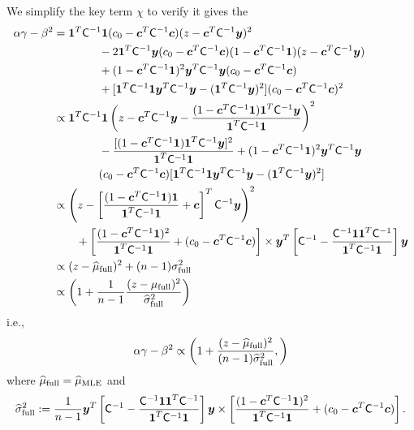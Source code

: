 \documentclass{iitthesis}          %
\newcommand{\bm}[1]{\boldsymbol{#1}}
\newcommand{\vc}{\bm{c}}
\newcommand{\vy}{\bm{y}}
\newcommand{\vone}{\bm{1}}
\newcommand{\mC}{\mathsf{C}}
\newcommand{\hmu}{\widehat{\mu}}
\newcommand{\hsigma}{\widehat{\sigma}}
\newcommand{\MLE}{\textup{MLE}}
\begin{document}
\iffalse
We simplify the key term $\chi$ to verify it gives the 
\begin{align*}
\alpha \gamma - \beta^2 
& = \vone^T \mC^{-1} \vone (c_0  -\vc ^T \mC^{-1} \vc) (z - \vc^T \mC^{-1} \vy )^2 \\
& \qquad \qquad - 2 \vone^T \mC^{-1} \vy (c_0  -\vc ^T \mC^{-1} \vc)(1 - \vc^T \mC^{-1} \vone)(z - \vc^T \mC^{-1} \vy ) \\
& \qquad \qquad + (1 - \vc^T \mC^{-1} \vone)^2 \vy^T \mC^{-1} \vy (c_0  -\vc ^T \mC^{-1} \vc) \\
&\qquad \qquad  + [\vone^T \mC^{-1} \vone \vy^T \mC^{-1} \vy - (\vone^T \mC^{-1} \vy)^2](c_0  -\vc ^T \mC^{-1} \vc)^2  \\
& \propto \vone^T \mC^{-1} \vone  \left (z - \vc^T \mC^{-1} \vy - \frac{(1 - \vc^T \mC^{-1} \vone)\vone^T \mC^{-1} \vy}{\vone^T \mC^{-1} \vone } \right )^2 \\
& \qquad \qquad -  \frac{[(1 - \vc^T \mC^{-1} \vone)\vone^T \mC^{-1} \vy]^2}{\vone^T \mC^{-1} \vone }  
+ (1 - \vc^T \mC^{-1} \vone)^2 \vy^T \mC^{-1} \vy \\
& \qquad \qquad (c_0  -\vc ^T \mC^{-1} \vc) [\vone^T \mC^{-1} \vone  \vy^T \mC^{-1} \vy
- (\vone^T \mC^{-1} \vy)^2] \\
& \propto \left (z - \left[ \frac{(1 - \vc^T \mC^{-1} \vone)\vone}{\vone^T \mC^{-1} \vone } + \vc \right]^T \mC^{-1} \vy \right )^2 \\
& \qquad  + \left[\frac{(1 - \vc^T \mC^{-1} \vone)^2}{\vone^T \mC^{-1} \vone} + (c_0  -\vc ^T \mC^{-1} \vc) \right] \times \vy^T\left[ \mC^{-1} 
- \frac{ \mC^{-1} \vone\vone^T \mC^{-1}}{\vone^T \mC^{-1} \vone}  \right]\vy
\\
& \propto (z - \widehat{\mu}_{\textup{full}})^2 + (n-1) \sigma_{\textup{full}}^2
\\
& \propto \left(1 +  \frac{1}{n-1} \frac{(z - \mu_{\textup{full}})^2}{\widehat{\sigma}_{\textup{full}}^2} \right)
\end{align*}
i.e.,
\begin{align*}
\alpha \gamma - \beta^2 \propto 
\left(
1 +  \frac{(z - \hmu_{\textup{full}})^2}{(n-1)\widehat{\sigma}_{\textup{full}}^2}, 
\right)
\end{align*}
where $\hmu_{\textup{full}} = \hmu_{\MLE}$ and 
\begin{multline*}
\hsigma^2_{\textup{full}} 
:= \frac{1}{n-1}
\vy^T\left[ \mC^{-1} 
- \frac{ \mC^{-1} \vone\vone^T \mC^{-1}}{\vone^T \mC^{-1} \vone}  \right]\vy
\times  \left[\frac{(1 - \vc^T \mC^{-1} \vone)^2}{\vone^T \mC^{-1} \vone} + (c_0  -\vc ^T \mC^{-1} \vc) \right].
\end{multline*}
\end{document}
